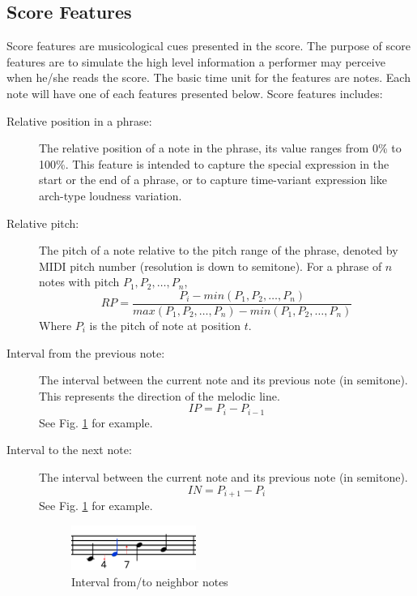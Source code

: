 \subsection{Score Features}
      Score features are musicological cues presented in the score. The purpose of score features are to simulate the high level information a performer may perceive when he/she reads the score. The basic time unit for the features are notes. Each note will have one of each features presented below.
      Score features includes:
      \begin{description}
         \item [Relative position in a phrase:]
            The relative position of a note in the phrase, its value ranges from 0\% to 100\%. %
            This feature is intended to capture the special expression in the start or the end of a phrase, or to capture time-variant expression like arch-type loudness variation.
         \item [Relative pitch:]
            The pitch of a note relative to the pitch range of the phrase, denoted by MIDI pitch number (resolution is down to semitone). For a phrase of $n$ notes with pitch $P_1, P_2, \dots, P_n$, $$RP = \frac{P_i -min(P_1, P_2, \dots, P_n) }{max(P_1, P_2, \dots, P_n)-min(P_1, P_2, \dots, P_n) }$$  Where $P_i$ is the pitch of note at position $t$.

         \item [Interval from the previous note:] The interval between the current note and its previous note (in semitone). This represents the direction of the melodic line. $$IP = P_{i} - P_{i-1} $$ See Fig. \ref{fig:interval} for example.
         \item [Interval to the next note:] The interval between the current note and its previous note (in semitone). $$IN = P_{i+1} - P_i$$ See Fig. \ref{fig:interval} for example.
         
      \begin{figure}[tp]
         \begin{center}
            \includegraphics[width=0.4\textwidth]{fig/interval_arrow}
         \end{center}
         \caption{Interval from/to neighbor notes}
         \label{fig:interval}
      \end{figure}


\end{description}
